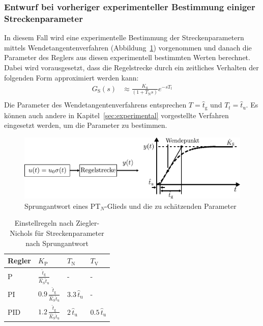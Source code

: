 \subsubsection{Entwurf bei vorheriger experimenteller Bestimmung einiger Streckenparameter}
%
In diesem Fall wird eine experimentelle Bestimmung der Streckenparametern mittels Wendetangentenverfahren (Abbildung~\ref{fig:wendetangente}) vorgenommen und danach die Parameter des Reglers aus diesen experimentell bestimmten Werten berechnet. Dabei wird vorausgesetzt, dass die Regelstrecke durch ein zeitliches Verhalten der folgenden Form approximiert werden kann:
%
\begin{equation*}
\begin{aligned}
%
G_{\text{S}}(s)&\approx \frac{K_{\text{S}}}{\left(1+T_{\text{N}}s\right)}e^{-sT_{t}}\\
%
\end{aligned}
\end{equation*}
%
Die Parameter des Wendetangentenverfahrens entsprechen $T=\hat{t}_{\text{g}}$ und $T_{t}=\hat{t}_{\text{u}}$. Es können auch andere in Kapitel~\ref{sec:experimental} vorgestellte Verfahren eingesetzt werden, um die Parameter zu bestimmen.
%
\begin{figure}[h]
	\centering
	\includegraphics[width=0.9\linewidth]{Abbildungen/Reglerentwurf/PDF/ZieglerNicholsSprung.pdf}
	\caption{Sprungantwort eines PT$_{N}$-Glieds und die zu schätzenden Parameter \cite{Foellinger94}}
	\label{fig:wendetangente}
\end{figure}
%
\begin{table}[h]\centering
	\caption{Einstellregeln nach Ziegler-Nichols für Streckenparameter nach Sprungantwort}
	\begin{tabular}{@{}llll@{}}\toprule
		Regler & $K_{\text{P}}$ & $T_{\text{N}}$ & $T_{\text{V}}$ \\ \bottomrule\bottomrule
		P & $\frac{\hat{t}_{\text{g}}}{\hat{K}_{\text{S}}\hat{t}_{\text{u}}}$ & - & - \\
		PI & $0.9\,\frac{\hat{t}_{\text{g}}}{\hat{K}_{\text{S}}\hat{t}_{\text{u}}}$ & ${3.3}\,\hat{t}_{\text{u}}$ & - \\
		PID & $1.2\,\frac{\hat{t}_{\text{g}}}{\hat{K}_{\text{S}}\hat{t}_{\text{u}}}$ & ${2}\,\hat{t}_{\text{u}}$ & ${0.5}\,\hat{t}_{\text{u}}$ \\
		\bottomrule
	\end{tabular}
	\label{tab:ziegler-nichols}
\end{table}
